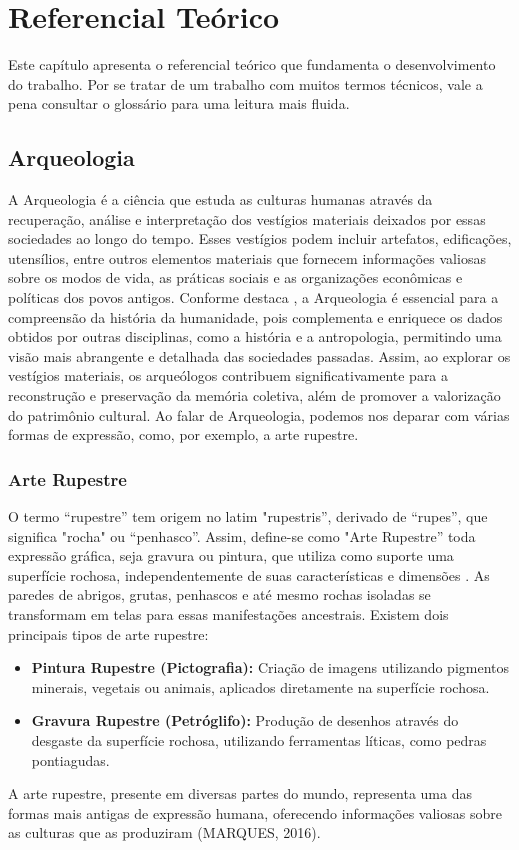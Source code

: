 \chapter{Referencial Teórico}
\label{Referencial_Teorico}
Este capítulo apresenta o referencial teórico que fundamenta o desenvolvimento do trabalho. Por se tratar de um trabalho com muitos termos técnicos, vale a pena consultar o glossário para uma leitura mais fluida. 

\section{Arqueologia}%
A Arqueologia é a ciência que estuda as culturas humanas através da recuperação, análise e interpretação dos vestígios materiais deixados por essas sociedades ao longo do tempo. Esses vestígios podem incluir artefatos, edificações, utensílios, entre outros elementos materiais que fornecem informações valiosas sobre os modos de vida, as práticas sociais e as organizações econômicas e políticas dos povos antigos. Conforme destaca \cite{funari2024arqueologia}, a Arqueologia é essencial para a compreensão da história da humanidade, pois complementa e enriquece os dados obtidos por outras disciplinas, como a história e a antropologia, permitindo uma visão mais abrangente e detalhada das sociedades passadas. Assim, ao explorar os vestígios materiais, os arqueólogos contribuem significativamente para a reconstrução e preservação da memória coletiva, além de promover a valorização do patrimônio cultural.
Ao falar de Arqueologia, podemos nos deparar com várias formas de expressão, como, por exemplo, a arte rupestre.
\subsection{Arte Rupestre}



O termo “rupestre” tem origem no latim "rupestris”, derivado de “rupes”, que significa "rocha" ou “penhasco”. Assim, define-se como "Arte Rupestre” toda expressão gráfica, seja gravura ou pintura, que utiliza como suporte uma superfície rochosa, independentemente de suas características e dimensões \cite[p. 7]{pedroignacioschmitz_1984_arte}. As paredes de abrigos, grutas, penhascos e até mesmo rochas isoladas se transformam em telas para essas manifestações ancestrais.
Existem dois principais tipos de arte rupestre:
\begin{itemize}
\item \textbf{Pintura Rupestre (Pictografia):} Criação de imagens utilizando pigmentos minerais, vegetais ou animais, aplicados diretamente na superfície rochosa.
\item \textbf{Gravura Rupestre (Petróglifo):} Produção de desenhos através do desgaste da superfície rochosa, utilizando ferramentas líticas, como pedras pontiagudas.
\end{itemize}
A arte rupestre, presente em diversas partes do mundo, representa uma das formas mais antigas de expressão humana, oferecendo informações valiosas sobre as culturas que as produziram (MARQUES, 2016).

